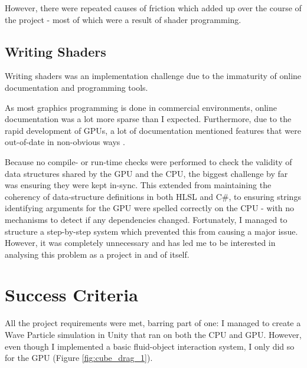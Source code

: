 \documentclass[12pt,a4paper,twoside]{report}
\begin{document}
However, there were repeated causes of friction which added up over the course
of the project - most of which were a result of shader programming.

\subsection{Writing Shaders}

Writing shaders was an implementation challenge due to the immaturity of online
documentation and programming tools.

As most graphics programming is done in commercial environments, online
documentation was a lot more sparse than I expected. Furthermore, due to the
rapid development of GPUs, a lot of documentation mentioned features that were
out-of-date in non-obvious ways \cite{Yuksel2007} \cite{NoPointSpritesUnityOne}
\cite{NoPointSpritesWorkaround}.

Because no compile- or run-time checks were performed to check the validity
of data structures shared by the GPU and the CPU, the biggest challenge by far
was ensuring they were kept in-sync. This extended from maintaining the
coherency of data-structure definitions in both HLSL and C\#, to ensuring
strings identifying arguments for the GPU were spelled correctly on the CPU -
with no mechanisms to detect if any dependencies changed. Fortunately, I
managed to structure a step-by-step system which prevented this from causing a
major issue. However, it was completely unnecessary and has led me to be
interested in analysing this problem as a project in and of itself.


\section{Success Criteria}

All the project requirements were met, barring part of one: I managed to create
a Wave Particle simulation in Unity that ran on both the CPU and GPU. However,
even though I implemented a basic fluid-object interaction system, I only did
so for the GPU (Figure \ref{fig:cube_drag_1}).
\end{document}
